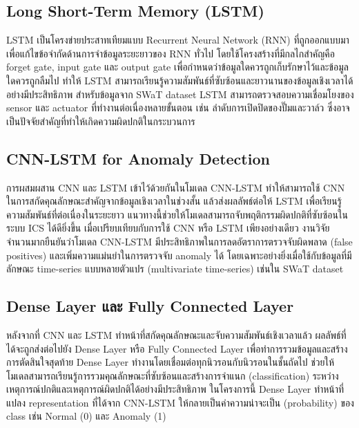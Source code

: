 \subsection{Long Short-Term Memory (LSTM)}
\hspace{2em} LSTM เป็นโครงข่ายประสาทเทียมแบบ Recurrent Neural Network (RNN) ที่ถูกออกแบบมาเพื่อแก้ไขข้อจำกัดด้านการจำข้อมูลระยะยาวของ RNN ทั่วไป โดยใช้โครงสร้างที่มีกลไกสำคัญคือ forget gate, input gate และ output gate เพื่อกำหนดว่าข้อมูลใดควรถูกเก็บรักษาไว้และข้อมูลใดควรถูกลืมไป ทำให้ LSTM สามารถเรียนรู้ความสัมพันธ์ที่ซับซ้อนและยาวนานของข้อมูลเชิงเวลาได้อย่างมีประสิทธิภาพ สำหรับข้อมูลจาก SWaT dataset LSTM สามารถตรวจสอบความเชื่อมโยงของ sensor และ actuator ที่ทำงานต่อเนื่องหลายขั้นตอน เช่น ลำดับการเปิดปิดของปั๊มและวาล์ว ซึ่งอาจเป็นปัจจัยสำคัญที่ทำให้เกิดความผิดปกติในกระบวนการ

\subsection{CNN-LSTM for Anomaly Detection}
\hspace{2em} การผสมผสาน CNN และ LSTM เข้าไว้ด้วยกันในโมเดล CNN-LSTM ทำให้สามารถใช้ CNN ในการสกัดคุณลักษณะสำคัญจากข้อมูลเชิงเวลาในช่วงสั้น แล้วส่งผลลัพธ์ต่อให้ LSTM เพื่อเรียนรู้ความสัมพันธ์ที่ต่อเนื่องในระยะยาว แนวทางนี้ช่วยให้โมเดลสามารถจับพฤติกรรมผิดปกติที่ซับซ้อนในระบบ ICS ได้ดียิ่งขึ้น เมื่อเปรียบเทียบกับการใช้ CNN หรือ LSTM เพียงอย่างเดียว งานวิจัยจำนวนมากยืนยันว่าโมเดล CNN-LSTM มีประสิทธิภาพในการลดอัตราการตรวจจับผิดพลาด (false positives) และเพิ่มความแม่นยำในการตรวจจับ anomaly ได้ โดยเฉพาะอย่างยิ่งเมื่อใช้กับข้อมูลที่มีลักษณะ time-series แบบหลายตัวแปร (multivariate time-series) เช่นใน SWaT dataset

\subsection{Dense Layer และ Fully Connected Layer}
\hspace{2em} หลังจากที่ CNN และ LSTM ทำหน้าที่สกัดคุณลักษณะและจับความสัมพันธ์เชิงเวลาแล้ว ผลลัพธ์ที่ได้จะถูกส่งต่อไปยัง Dense Layer หรือ Fully Connected Layer เพื่อทำการรวมข้อมูลและสร้างการตัดสินใจสุดท้าย Dense Layer ทำงานโดยเชื่อมต่อทุกนิวรอนกับนิวรอนในชั้นถัดไป ช่วยให้โมเดลสามารถเรียนรู้การรวมคุณลักษณะที่ซับซ้อนและสร้างการจำแนก (classification) ระหว่างเหตุการณ์ปกติและเหตุการณ์ผิดปกติได้อย่างมีประสิทธิภาพ
ในโครงการนี้ Dense Layer ทำหน้าที่แปลง representation ที่ได้จาก CNN-LSTM ให้กลายเป็นค่าความน่าจะเป็น (probability) ของ class เช่น Normal (0) และ Anomaly (1)

